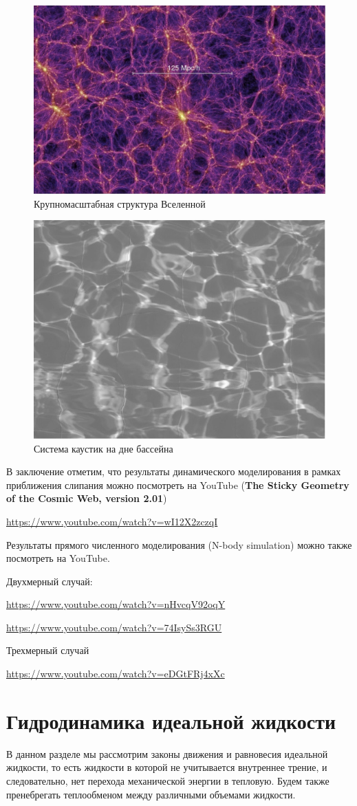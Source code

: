 \begin{figure}[H]
	\centering
	\includegraphics[width=.5\linewidth]{photo/1}
	\caption{Крупномасштабная структура Вселенной}
	\label{fig:figure1}
\end{figure}
\begin{figure}[H]
	\centering
	\includegraphics[width=.5\linewidth]{photo/2}
	\caption{Система каустик на дне бассейна}
	\label{fig:figure2}
\end{figure}
В заключение отметим, что результаты динамического моделирования в рамках приближения слипания можно посмотреть на YouTube (\textbf{The Sticky Geometry of the Cosmic Web, version 2.01})

\url{https://www.youtube.com/watch?v=wI12X2zczqI}

Результаты прямого численного моделирования (N-body simulation) можно также  посмотреть на YouTube.

Двухмерный случай:

\url{https://www.youtube.com/watch?v=nHvcqV92oqY}

\url{https://www.youtube.com/watch?v=74IsySs3RGU}

Трехмерный случай

\url{https://www.youtube.com/watch?v=eDGtFRj4xXc}


\newpage
\section{Гидродинамика идеальной жидкости}

В  данном разделе мы рассмотрим законы движения и равновесия идеальной жидкости, то есть жидкости в которой не учитывается внутреннее трение, и следовательно, нет перехода механической энергии в тепловую. Будем также пренебрегать теплообменом между  различными объемами жидкости.

